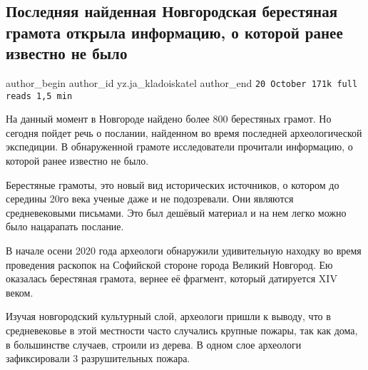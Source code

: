  
 
 
 
 
 
\subsection{Последняя найденная Новгородская берестяная грамота открыла информацию, о которой ранее известно не было}
\label{sec:20_10_2020.sites.ru.zen_yandex.yz.ja_kladoiskatel.1.poslednjaja_gramota_novgorod}
\ifcmt
	author_begin
   author_id yz.ja_kladoiskatel
	author_end
\fi
\verb|20 October 171k full reads 1,5 min|

На данный момент в Новгороде найдено более 800 берестяных грамот. Но сегодня
пойдет речь о послании, найденном во время последней археологической
экспедиции. В обнаруженной грамоте исследователи прочитали информацию, о
которой ранее известно не было.

Берестяные грамоты, это новый вид исторических источников, о котором до
середины 20го века ученые даже и не подозревали. Они являются средневековыми
письмами. Это был дешёвый материал и на нем легко можно было нацарапать
послание.

В начале осени 2020 года археологи обнаружили удивительную находку во время
проведения раскопок на Софийской стороне города Великий Новгород. Ею оказалась
берестяная грамота, вернее её фрагмент, который датируется XIV веком.

Изучая новгородский культурный слой, археологи пришли к выводу, что в
средневековье в этой местности часто случались крупные пожары, так как дома, в
большинстве случаев, строили из дерева. В одном слое археологи зафиксировали 3
разрушительных пожара.

